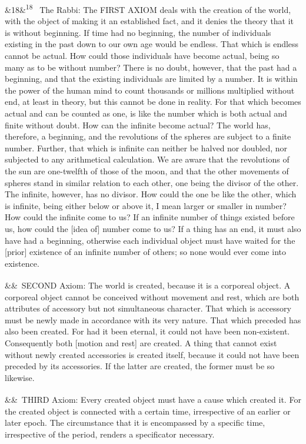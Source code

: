 \documentclass[12pt]{article}
\newcommand{\para}[1][]{\par\noindent\ifx&#1&\else\textsuperscript{\footnotesize #1}~\fi}
\begin{document}
\para[18] The Rabbi: The FIRST AXIOM deals with the creation of the world, with the object of making it an established fact, and it denies the theory that it is without beginning. If time had no beginning, the number of individuals existing in the past down to our own age would be endless. That which is endless cannot be actual. How could those individuals have become actual, being so many as to be without number? There is no doubt, however, that the past had a beginning, and that the existing individuals are limited by a number. It is within the power of the human mind to count thousands or millions multiplied without end, at least in theory, but this cannot be done in reality. For that which becomes actual and can be counted as one, is like the number which is both actual and finite without doubt. How can the infinite become actual? The world has, therefore, a beginning, and the revolutions of the spheres are subject to a finite number. Further, that which is infinite can neither be halved nor doubled, nor subjected to any arithmetical calculation. We are aware that the revolutions of the sun are one-twelfth of those of the moon, and that the other movements of spheres stand in similar relation to each other, one being the divisor of the other. The infinite, however, has no divisor. How could the one be like the other, which is infinite, being either below or above it, I mean larger or smaller in number? How could the infinite come to us? If an infinite number of things existed before us, how could the [idea of] number come to us? If a thing has an end, it must also have had a beginning, otherwise each individual object must have waited for the [prior] existence of an infinite number of others; so none would ever come into existence.

\para SECOND Axiom: The world is created, because it is a corporeal object. A corporeal object cannot be conceived without movement and rest, which are both attributes of accessory but not simultaneous character. That which is accessory must be newly made in accordance with its very nature. That which preceded has also been created. For had it been eternal, it could not have been non-existent. Consequently both [motion and rest] are created. A thing that cannot exist without newly created accessories is created itself, because it could not have been preceded by its accessories. If the latter are created, the former must be so likewise.

\para THIRD Axiom: Every created object must have a cause which created it. For the created object is connected with a certain time, irrespective of an earlier or later epoch. The circumstance that it is encompassed by a specific time, irrespective of the period, renders a specificator necessary.
\end{document}
